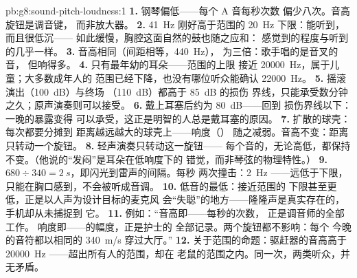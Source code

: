 \begin{solution}{pb:g8:sound-pitch-loudness:1}
\textbf{1.} 钢琴偏低——每个 A 音每秒次数
偏少八次。音高旋钮是调音键，
而非放大器。
\textbf{2.} \qty{41}{Hz} 刚好高于范围的
\qty{20}{Hz} 下限：能听到，而且很低沉——
如此缓慢，胸腔这面自然的鼓也随之应和：
感觉到的程度与听到的几乎一样。
\textbf{3.} 音高相同（间距相等，\qty{440}{Hz}），
为三倍：歌手唱的是音叉的音，
但响得多。
\textbf{4.} 只有最年幼的耳朵——范围的上限
接近 \qty{20000}{Hz}，属于儿童；大多数成年人的
范围已经下降，也没有哪位听众能确认
\qty{22000}{Hz}。
\textbf{5.} 摇滚演出（\qty{100}{dB}）与终场
（\qty{110}{dB}）都高于 \qty{85}{dB} 的损伤
界线，只能承受数分钟之久；原声演奏则可以接受。
\textbf{6.} 戴上耳塞后约为 \qty{80}{dB}——回到
损伤界线以下：一晚的暴露变得
可以承受，这正是明智的人总是戴耳塞的原因。
\textbf{7.} 扩散的球壳：每次都要分摊到
距离越远越大的球壳上——响度（）
随之减弱。音高不变：距离只转动一个旋钮。
\textbf{8.} 轻声演奏只转动这一旋钮——
每个音的，无论高低，都保持
不变。（他说的“发闷”是耳朵在低响度下的
错觉，而非琴弦的物理特性。）
\textbf{9.} $680 \div 340 = \qty{2}{s}$，即闪光到雷声的间隔。每秒
两次撞击：\qty{2}{Hz} ——远低于下限，
只能在胸口感到，不会被听成音调。
\textbf{10.} 低音的最低：接近范围的
下限甚至更低，正是以人声为设计目标的麦克风
会“失聪”的地方——隆隆声是真实存在的，手机却从未捕捉到
它。
\textbf{11.} 例如：“音高即——每秒的次数，
正是调音师的全部工作。
响度即——的幅度，正是护士的
全部记录。两个旋钮都不影响：每个
今晚的音符都以相同的 \qty{340}{m/s} 穿过大厅。”
\textbf{12.} 关于范围的命题：驱赶器的音高高于
\qty{20000}{Hz} ——超出所有人的范围，却在
老鼠的范围之内。同一次，两类听众，并无矛盾。
\end{solution}
